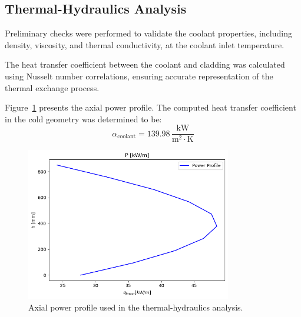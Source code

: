 \subsection{Thermal-Hydraulics Analysis}
Preliminary checks were performed to validate the coolant properties, including density, viscosity, and thermal conductivity, at the coolant inlet temperature.

The heat transfer coefficient between the coolant and cladding was calculated using Nusselt number correlations, ensuring accurate representation of the thermal exchange process.

Figure~\ref{fig:thermal_hydraulics} presents the axial power profile. The computed heat transfer coefficient in the cold geometry was determined to be:
\[
\alpha_{\text{coolant}} = 139.98 \, \frac{\text{kW}}{\text{m}^2 \cdot \text{K}}
\]

\begin{figure}[H]
    \centering
    \includegraphics[width=0.8\textwidth]{power_profile.png}
    \caption{Axial power profile used in the thermal-hydraulics analysis.}
    \label{fig:thermal_hydraulics}
\end{figure}
